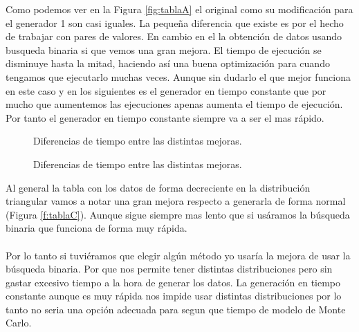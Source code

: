 \documentclass[12pt,a4paper]{article}
\begin{document}
Como podemos ver en la Figura \ref{fig:tablaA} el original como su modificación para el generador 1 son casi iguales. La pequeña diferencia que existe es por el hecho de trabajar con pares de valores. En cambio en el la obtención de datos usando busqueda binaria si que vemos una gran mejora. El tiempo de ejecución se disminuye hasta la mitad, haciendo así una buena optimización para cuando tengamos que ejecutarlo muchas veces. Aunque sin dudarlo el que mejor funciona en este caso y en los siguientes es el generador en tiempo constante que por mucho que aumentemos las ejecuciones apenas aumenta el tiempo de ejecución. Por tanto el generador en tiempo constante siempre va a ser el mas rápido. 
\begin{figure}[H]
	\centering
	\caption{Diferencias de tiempo entre las distintas mejoras.}
	\caption{Diferencias de tiempo entre las distintas mejoras.}
	\label{f:generadores1}
\end{figure}
Al general la tabla con los datos de forma decreciente en la distribución triangular vamos a notar una gran mejora respecto a generarla de forma normal (Figura \ref{f:tablaC}). Aunque sigue siempre mas lento que si usáramos la búsqueda binaria que funciona de forma muy rápida. \\ \\Por lo tanto si tuviéramos que elegir algún método yo usaría la mejora de usar la búsqueda binaria. Por que nos permite tener distintas distribuciones pero sin gastar excesivo tiempo a la hora de generar los datos. La generación en tiempo constante aunque es muy rápida nos impide usar distintas distribuciones por lo tanto no seria una opción adecuada para segun que tiempo de modelo de Monte Carlo. 
\end{document}
